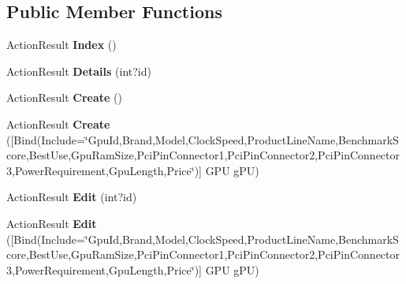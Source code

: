 \subsection*{Public Member Functions}
\begin{DoxyCompactItemize}
\item 
Action\+Result {\bfseries Index} ()\hypertarget{class_p_c_builder_m_v_c_1_1_controllers_1_1_g_p_u_controller_a38923ec0854ca8ca5d0247bae3068d4f}{}\label{class_p_c_builder_m_v_c_1_1_controllers_1_1_g_p_u_controller_a38923ec0854ca8ca5d0247bae3068d4f}

\item 
Action\+Result {\bfseries Details} (int?id)\hypertarget{class_p_c_builder_m_v_c_1_1_controllers_1_1_g_p_u_controller_a78d3d59dbfde397dbddb047d0c7db090}{}\label{class_p_c_builder_m_v_c_1_1_controllers_1_1_g_p_u_controller_a78d3d59dbfde397dbddb047d0c7db090}

\item 
Action\+Result {\bfseries Create} ()\hypertarget{class_p_c_builder_m_v_c_1_1_controllers_1_1_g_p_u_controller_ace84f79eaf685c05dce52af070c4b519}{}\label{class_p_c_builder_m_v_c_1_1_controllers_1_1_g_p_u_controller_ace84f79eaf685c05dce52af070c4b519}

\item 
Action\+Result {\bfseries Create} (\mbox{[}Bind(Include=\char`\"{}Gpu\+Id,Brand,Model,Clock\+Speed,Product\+Line\+Name,Benchmark\+Score,Best\+Use,Gpu\+Ram\+Size,Pci\+Pin\+Connector1,Pci\+Pin\+Connector2,Pci\+Pin\+Connector3,Power\+Requirement,Gpu\+Length,Price\char`\"{})\mbox{]} G\+PU g\+PU)\hypertarget{class_p_c_builder_m_v_c_1_1_controllers_1_1_g_p_u_controller_aa34201847e1e5c053d778e2b0a38650e}{}\label{class_p_c_builder_m_v_c_1_1_controllers_1_1_g_p_u_controller_aa34201847e1e5c053d778e2b0a38650e}

\item 
Action\+Result {\bfseries Edit} (int?id)\hypertarget{class_p_c_builder_m_v_c_1_1_controllers_1_1_g_p_u_controller_aeb7156b1f3d6bab93118cb778e75bea8}{}\label{class_p_c_builder_m_v_c_1_1_controllers_1_1_g_p_u_controller_aeb7156b1f3d6bab93118cb778e75bea8}

\item 
Action\+Result {\bfseries Edit} (\mbox{[}Bind(Include=\char`\"{}Gpu\+Id,Brand,Model,Clock\+Speed,Product\+Line\+Name,Benchmark\+Score,Best\+Use,Gpu\+Ram\+Size,Pci\+Pin\+Connector1,Pci\+Pin\+Connector2,Pci\+Pin\+Connector3,Power\+Requirement,Gpu\+Length,Price\char`\"{})\mbox{]} G\+PU g\+PU)\hypertarget{class_p_c_builder_m_v_c_1_1_controllers_1_1_g_p_u_controller_a0d21736b4431a17c038d500bf09ba00e}{}\label{class_p_c_builder_m_v_c_1_1_controllers_1_1_g_p_u_controller_a0d21736b4431a17c038d500bf09ba00e}


\end{DoxyCompactItemize}
